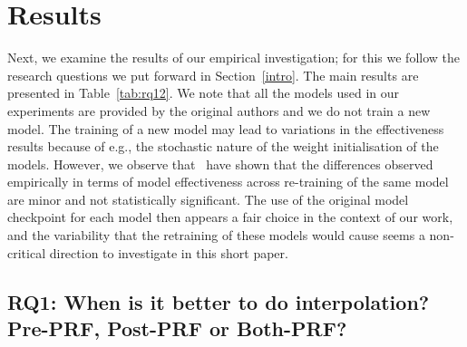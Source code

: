 
\section{Results}

Next, we examine the results of our empirical investigation; for this we follow the research questions we put forward in Section~\ref{intro}. The main results are presented in Table~\ref{tab:rq12}. We note that all the models used in our experiments are provided by the original authors and we do not train a new model. The training of a new model may lead to variations in the effectiveness results because of e.g., the stochastic nature of the weight initialisation of the models. 
However, we observe that~\citet{li2022improving} have shown that the differences observed empirically in terms of model effectiveness across re-training of the same model are minor and not statistically significant. The use of the original model checkpoint for each model then appears a fair choice in the context of our work, and the variability that the retraining of these models would cause seems a non-critical direction to investigate in this short paper. 

\subsection{RQ1: When is it better to do interpolation? Pre-PRF, Post-PRF or Both-PRF?}


